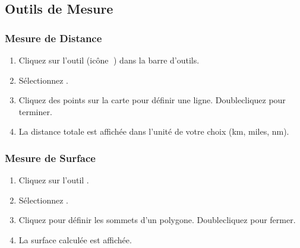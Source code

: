\documentclass[letterpaper,10pt,english]{sphinxmanual}
\begin{document}
\subsection{Outils de Mesure}
\label{\detokenize{fr/04_explorer_cartes:outils-de-mesure}}

\subsubsection{Mesure de Distance}
\label{\detokenize{fr/04_explorer_cartes:mesure-de-distance}}\begin{enumerate}
%
\item {} 
\sphinxAtStartPar
Cliquez sur l’outil  (icône 📐) dans la barre d’outils.

\item {} 
\sphinxAtStartPar
Sélectionnez .

\item {} 
\sphinxAtStartPar
Cliquez des points sur la carte pour définir une ligne. Double\sphinxhyphen{}cliquez pour terminer.

\item {} 
\sphinxAtStartPar
La distance totale est affichée dans l’unité de votre choix (km, miles, nm).

\end{enumerate}


\subsubsection{Mesure de Surface}
\label{\detokenize{fr/04_explorer_cartes:mesure-de-surface}}\begin{enumerate}
%
\item {} 
\sphinxAtStartPar
Cliquez sur l’outil .

\item {} 
\sphinxAtStartPar
Sélectionnez .

\item {} 
\sphinxAtStartPar
Cliquez pour définir les sommets d’un polygone. Double\sphinxhyphen{}cliquez pour fermer.

\item {} 
\sphinxAtStartPar
La surface calculée est affichée.

\end{enumerate}
\end{document}
